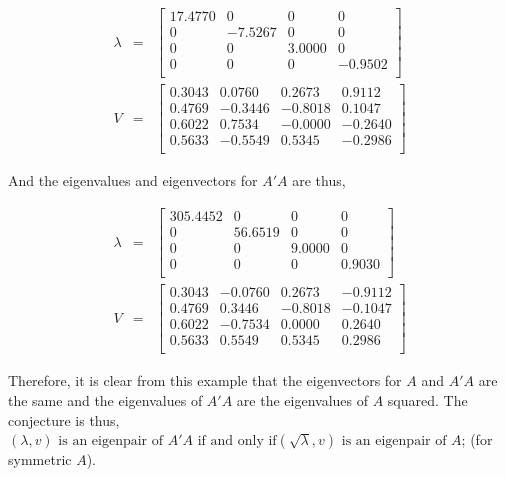 \begin{eqnarray}
  \lambda &=&
  \begin{bmatrix}
   17.4770 &        0 &        0 &        0 \\
         0 &  -7.5267 &        0 &        0 \\
         0 &        0 &   3.0000 &        0 \\
         0 &        0 &        0 &  -0.9502 \\
  \end{bmatrix}
  \\
  V &=&
  \begin{bmatrix}
    0.3043 &   0.0760 &   0.2673 &   0.9112 \\
    0.4769 &  -0.3446 &  -0.8018 &   0.1047 \\
    0.6022 &   0.7534 &  -0.0000 &  -0.2640 \\
    0.5633 &  -0.5549 &   0.5345 &  -0.2986 \\
  \end{bmatrix}
\end{eqnarray}

And the eigenvalues and eigenvectors for \(A'A\) are thus,

\begin{eqnarray}
  \lambda &=&
  \begin{bmatrix}
  305.4452 &        0 &        0 &        0 \\
         0 &  56.6519 &        0 &        0 \\
         0 &        0 &   9.0000 &        0 \\
         0 &        0 &        0 &   0.9030 \\
  \end{bmatrix}
  \\
  V &=&
  \begin{bmatrix}
    0.3043 &  -0.0760 &   0.2673 &  -0.9112 \\
    0.4769 &   0.3446 &  -0.8018 &  -0.1047 \\
    0.6022 &  -0.7534 &   0.0000 &   0.2640 \\
    0.5633 &   0.5549 &   0.5345 &   0.2986 \\
  \end{bmatrix}
\end{eqnarray}

Therefore, it is clear from this example that the eigenvectors for \(A\) and \(A'A\) are the same and the eigenvalues of \(A'A\) are the eigenvalues of \(A\) squared.
The conjecture is thus, \((\lambda,v) \text{ is an eigenpair of } A'A \text{ if and only if} (\sqrt{\lambda},v) \text{ is an eigenpair of } A\); (for symmetric \(A\)).

